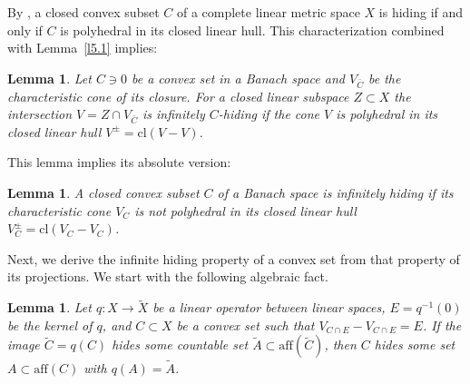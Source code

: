 \documentclass{amsart}
\newcommand{\cl}{\mathrm{cl}}
\newcommand{\aff}{\mathrm{aff}}
\newtheorem{lemma}[theorem]{Lemma}
\theoremstyle{definition}
\begin{document}
By \cite{BH}, a closed convex subset $C$ of a complete linear metric space $X$ is hiding if and only if $C$ is polyhedral in its closed linear hull. This characterization combined with Lemma~\ref{l5.1} implies:

\begin{lemma}\label{l5.2} Let $C\ni 0$ be a convex set in a Banach space and $V_{\bar C}$ be the characteristic cone of its closure. For a closed linear subspace $Z\subset X$ the intersection $V=Z\cap V_{\bar C}$ is infinitely $C$-hiding if the cone $V$ is polyhedral in its closed linear hull $V^\pm=\cl(V-V)$.
\end{lemma}

This lemma implies its absolute version:

\begin{lemma}\label{l5.3} A closed convex subset $C$ of a Banach space is infinitely hiding if its characteristic cone $V_C$ is not polyhedral in its closed linear hull $V_C^\pm=\cl(V_C-V_C)$.
\end{lemma}

Next, we derive the infinite hiding property of a convex set from that property of its projections. We start with the following algebraic fact.


\begin{lemma}\label{l5.4} Let $q:X\to \tilde X$ be a linear operator between linear spaces, $E=q^{-1}(0)$ be the kernel of $q$,  and $C\subset X$ be a convex set such that $V_{C\cap E}-V_{C\cap E}=E$. If the image $\tilde C=q(C)$ hides some countable set $\tilde A\subset \aff(\tilde C)$, then $C$ hides some set $A\subset \aff(C)$ with $q(A)=\tilde A$.
\end{lemma}
\end{document}
